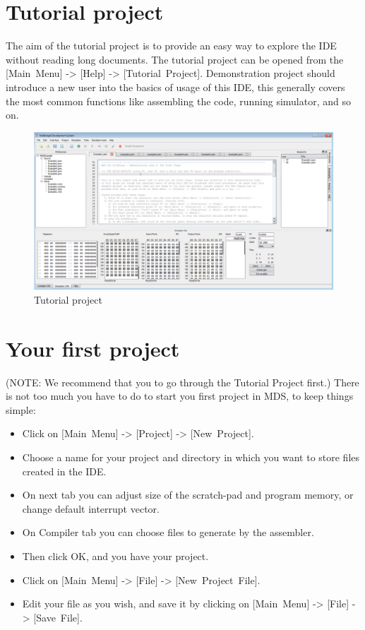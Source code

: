 \section{Tutorial project}
    The aim of the tutorial project is to provide an easy way to explore the IDE without reading long documents.
    The tutorial project can be opened from the [Main~Menu] -> [Help] -> [Tutorial~Project]. Demonstration project
    should introduce a new user into the basics of usage of this IDE, this generally covers the most common functions
    like assembling the code, running simulator, and so on.
    \begin{figure}[h]
        \centering
        \includegraphics[width=\textwidth]{img/demonstration_1.png}
        \caption{Tutorial project}
    \end{figure}

\clearpage
\section{Your first project}
    (NOTE: We recommend that you to go through the Tutorial Project first.) There is not too much you have to do to start you first project in MDS, to keep things simple:
    \begin{itemize}
        \item Click on [Main~Menu] -> [Project] -> [New~Project].
        \item Choose a name for your project and directory in which you want to store files created in the IDE.
        \item On next tab you can adjust size of the scratch-pad and program memory, or change default interrupt vector.
        \item On Compiler tab you can choose files to generate by the assembler.
        \item Then click OK, and you have your project.
        \item Click on [Main~Menu] -> [File] -> [New~Project~File].
        \item Edit your file as you wish, and save it by clicking on [Main~Menu] -> [File] -> [Save~File].
    \end{itemize}

